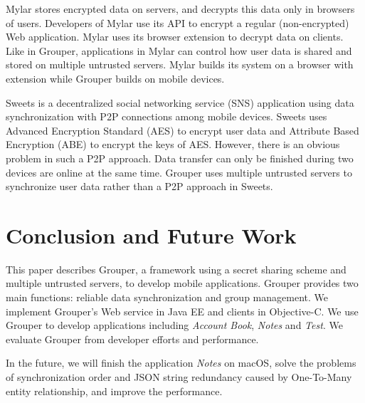 \documentclass[twocolumn,10pt]{article}
\begin{document}
Mylar\cite{popa2014building} stores encrypted data on servers, and decrypts this data only in browsers of users. 
Developers of Mylar use its API to encrypt a regular (non-encrypted) Web application. 
Mylar uses its browser extension to decrypt data on clients. 
Like in Grouper, applications in Mylar can control how user data is shared and stored on multiple untrusted servers. 
Mylar builds its system on a browser with extension while Grouper builds on mobile devices.

Sweets\cite{sweets} is a decentralized social networking service (SNS) application using data synchronization with P2P connections among mobile devices. 
Sweets uses Advanced Encryption Standard (AES) to encrypt user data and Attribute Based Encryption (ABE) to encrypt the keys of AES. 
However, there is an obvious problem in such a P2P approach. 
Data transfer can only be finished during two devices are online at the same time. 
Grouper uses multiple untrusted servers to synchronize user data rather than a P2P approach in Sweets.

\section{Conclusion and Future Work}

This paper describes Grouper, a framework using a secret sharing scheme and multiple untrusted servers, to develop mobile applications.
Grouper provides two main functions: reliable data synchronization and group management. 
We implement Grouper's Web service in Java EE and clients in Objective-C. 
We use Grouper to develop applications including \emph{Account Book}, \emph{Notes} and \emph{Test}. 
We evaluate Grouper from developer efforts and performance. 

In the future, we will finish the application \emph{Notes} on macOS, solve the problems of synchronization order and JSON string redundancy caused by One-To-Many entity relationship, and improve the performance.


{
	\footnotesize
	
}
\end{document}
